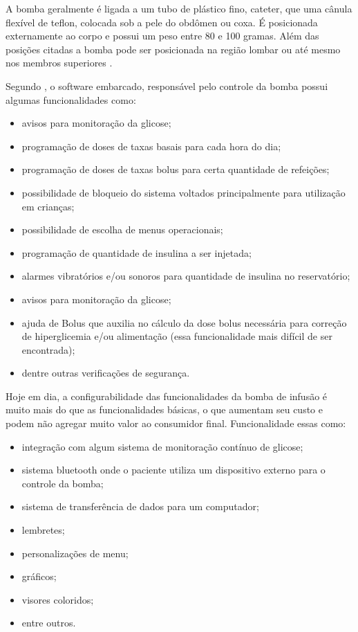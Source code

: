 A bomba geralmente é ligada a um tubo de plástico fino, cateter, que uma cânula flexível de teflon, colocada sob a pele do obdômen ou coxa. É posicionada externamente ao corpo e possui um peso entre 80 e 100 gramas. Além das posições citadas a bomba pode ser posicionada na região lombar ou até mesmo nos membros superiores \cite{minicucci2008uso}.

Segundo \cite{amorim2008novas}, o software embarcado, responsável pelo controle da bomba possui algumas funcionalidades como:

\begin{itemize}
\item avisos para monitoração da glicose;
\item programação de doses de taxas basais para cada hora do dia;
\item programação de doses de taxas bolus para certa quantidade de refeições;
\item possibilidade de bloqueio do sistema voltados principalmente para utilização em crianças;
\item possibilidade de escolha de menus operacionais;
\item programação de quantidade de insulina a ser injetada;
\item alarmes vibratórios e/ou sonoros para quantidade de insulina no reservatório;
\item avisos para monitoração da glicose;
\item ajuda de Bolus que auxilia no cálculo da dose bolus necessária para correção de hiperglicemia e/ou alimentação (essa funcionalidade mais difícil de ser encontrada);
\item dentre outras verificações de segurança.
\end{itemize}

Hoje em dia, a configurabilidade das funcionalidades da bomba de infusão é muito mais do que as funcionalidades básicas, o que aumentam seu custo e podem não agregar muito valor ao consumidor final. Funcionalidade essas como:

\begin{itemize}
\item integração com algum sistema de monitoração contínuo de glicose;
\item sistema bluetooth onde o paciente utiliza um dispositivo externo para o controle da bomba;
\item sistema de transferência de dados para um computador;
\item lembretes;
\item personalizações de menu;
\item gráficos;
\item visores coloridos;
\item entre outros.
\end{itemize}

